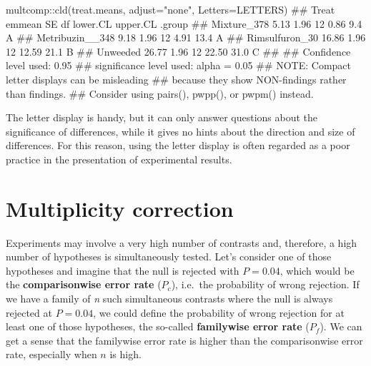 \documentclass[a4paper,12pt,oneside]{book}
\newenvironment{Shaded}{\begin{snugshade}}{\end{snugshade}}
\newcommand{\SpecialCharTok}[1]{#1}
\newcommand{\StringTok}[1]{#1}
\newcommand{\DocumentationTok}[1]{#1}
\newcommand{\FunctionTok}[1]{#1}
\newcommand{\AttributeTok}[1]{#1}
\newcommand{\AlertTok}[1]{#1}
\newcommand{\NormalTok}[1]{#1}
\begin{document}
\begin{Shaded}
\begin{Highlighting}[]
\NormalTok{multcomp}\SpecialCharTok{::}\FunctionTok{cld}\NormalTok{(treat.means, }\AttributeTok{adjust=}\StringTok{"none"}\NormalTok{, }\AttributeTok{Letters=}\NormalTok{LETTERS)}
\DocumentationTok{\#\#  Treat           emmean   SE df lower.CL upper.CL .group}
\DocumentationTok{\#\#  Mixture\_378       5.13 1.96 12     0.86      9.4  A    }
\DocumentationTok{\#\#  Metribuzin\_\_348   9.18 1.96 12     4.91     13.4  A    }
\DocumentationTok{\#\#  Rimsulfuron\_30   16.86 1.96 12    12.59     21.1   B   }
\DocumentationTok{\#\#  Unweeded         26.77 1.96 12    22.50     31.0    C  }
\DocumentationTok{\#\# }
\DocumentationTok{\#\# Confidence level used: 0.95 }
\DocumentationTok{\#\# significance level used: alpha = 0.05 }
\DocumentationTok{\#\# }\AlertTok{NOTE}\DocumentationTok{: Compact letter displays can be misleading}
\DocumentationTok{\#\#       because they show NON{-}findings rather than findings.}
\DocumentationTok{\#\#       Consider using \textquotesingle{}pairs()\textquotesingle{}, \textquotesingle{}pwpp()\textquotesingle{}, or \textquotesingle{}pwpm()\textquotesingle{} instead.}
\end{Highlighting}
\end{Shaded}

The letter display is handy, but it can only answer questions about the significance of differences, while it gives no hints about the direction and size of differences. For this reason, using the letter display is often regarded as a poor practice in the presentation of experimental results.

\hypertarget{multiplicity-correction}{%
\section{Multiplicity correction}\label{multiplicity-correction}}

Experiments may involve a very high number of contrasts and, therefore, a high number of hypotheses is simultaneously tested. Let's consider one of those hypotheses and imagine that the null is rejected with \(P = 0.04\), which would be the \textbf{comparisonwise error rate} (\(P_c\)), i.e.~the probability of wrong rejection. If we have a family of \emph{n} such simultaneous contrasts where the null is always rejected at \(P = 0.04\), we could define the probability of wrong rejection for at least one of those hypotheses, the so-called \textbf{familywise error rate} (\(P_f\)). We can get a sense that the familywise error rate is higher than the comparisonwise error rate, especially when \(n\) is high.
\end{document}
